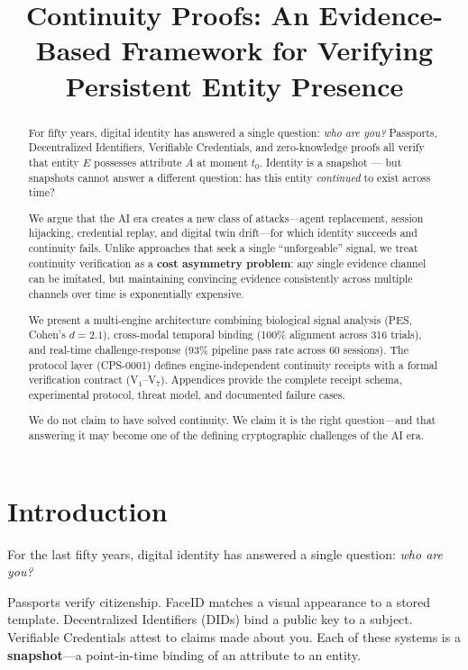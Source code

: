 \documentclass[conference]{IEEEtran}
\title{Continuity Proofs: An Evidence-Based Framework for Verifying Persistent Entity Presence}
\author{
\IEEEauthorblockN{Raymond Wu}
\IEEEauthorblockA{The Continuity Lab\\
\url{https://www.myshape.com/research}}
}
\begin{document}
\maketitle

\begin{abstract}
For fifty years, digital identity has answered a single question: \textit{who are you?} Passports, Decentralized Identifiers, Verifiable Credentials, and zero-knowledge proofs all verify that entity $E$ possesses attribute $A$ at moment $t_0$. Identity is a snapshot --- but snapshots cannot answer a different question: has this entity \textit{continued} to exist across time?

We argue that the AI era creates a new class of attacks---agent replacement, session hijacking, credential replay, and digital twin drift---for which identity succeeds and continuity fails. Unlike approaches that seek a single ``unforgeable'' signal, we treat continuity verification as a \textbf{cost asymmetry problem}: any single evidence channel can be imitated, but maintaining convincing evidence consistently across multiple channels over time is exponentially expensive.

We present a multi-engine architecture combining biological signal analysis (PES, Cohen's $d = 2.1$), cross-modal temporal binding (100\% alignment across 316 trials), and real-time challenge-response (93\% pipeline pass rate across 60 sessions). The protocol layer (CPS-0001) defines engine-independent continuity receipts with a formal verification contract (V$_1$--V$_7$). Appendices provide the complete receipt schema, experimental protocol, threat model, and documented failure cases.

We do not claim to have solved continuity. We claim it is the right question---and that answering it may become one of the defining cryptographic challenges of the AI era.
\end{abstract}

\section{Introduction}

For the last fifty years, digital identity has answered a single question: \textit{who are you?}

Passports verify citizenship. FaceID matches a visual appearance to a stored template. Decentralized Identifiers (DIDs) bind a public key to a subject. Verifiable Credentials attest to claims made about you. Each of these systems is a \textbf{snapshot}---a point-in-time binding of an attribute to an entity.
\end{document}
